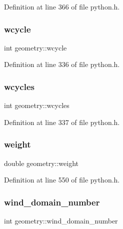 Definition at line 366 of file python.\+h.

\mbox{\label{structgeometry_ab344978ef2535435535587ec5d5a3d6e}} 
\subsubsection{\texorpdfstring{wcycle}{wcycle}}
{\footnotesize\ttfamily int geometry\+::wcycle}



Definition at line 336 of file python.\+h.

\mbox{\label{structgeometry_aa741269f119248a897fc45d181117656}} 
\subsubsection{\texorpdfstring{wcycles}{wcycles}}
{\footnotesize\ttfamily int geometry\+::wcycles}



Definition at line 337 of file python.\+h.

\mbox{\label{structgeometry_a596bf1a85fcdd4da0e5308e59eda2a9a}} 
\subsubsection{\texorpdfstring{weight}{weight}}
{\footnotesize\ttfamily double geometry\+::weight}



Definition at line 550 of file python.\+h.

\mbox{\label{structgeometry_ad5f13d453a358b8d069e20497b7edf9d}} 
\subsubsection{\texorpdfstring{wind\+\_\+domain\+\_\+number}{wind\_domain\_number}}
{\footnotesize\ttfamily int geometry\+::wind\+\_\+domain\+\_\+number}



